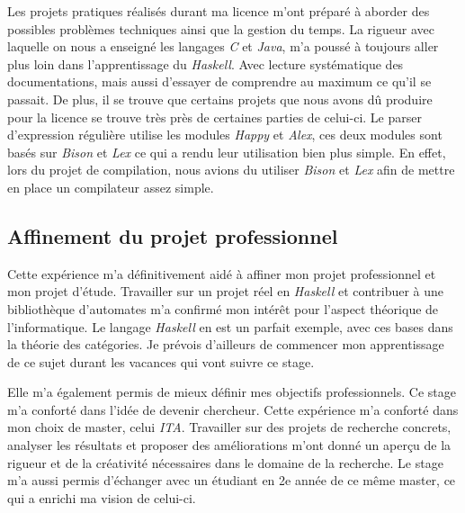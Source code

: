 \vphantom{}

Les projets pratiques réalisés durant ma licence m'ont préparé à aborder des 
possibles problèmes techniques ainsi que la gestion du temps. La rigueur avec 
laquelle on nous a enseigné les langages \textit{C} et \textit{Java}, m’a 
poussé à toujours aller plus loin dans l'apprentissage du \textit{Haskell}. Avec 
lecture systématique des documentations, mais aussi d'essayer de comprendre au 
maximum ce qu'il se passait. De plus, il se trouve que certains projets que nous 
avons dû produire pour la licence se trouve très près de certaines parties de 
celui-ci. Le parser d'expression régulière utilise les modules \textit{Happy} et 
\textit{Alex}, ces deux modules sont basés sur \textit{Bison} et \textit{Lex} ce 
qui a rendu leur utilisation bien plus simple. En effet, lors du projet de 
compilation, nous avions du utiliser \textit{Bison} et \textit{Lex} afin de 
mettre en place un compilateur assez simple. 

\subsection{Affinement du projet professionnel}

Cette expérience m'a définitivement aidé à affiner mon projet professionnel et 
mon projet d'étude. Travailler sur un projet réel en \textit{Haskell} et 
contribuer à une bibliothèque d'automates m'a confirmé mon intérêt pour l'aspect 
théorique de l'informatique. Le langage \textit{Haskell} en est un parfait 
exemple, avec ces bases dans la théorie des catégories. Je prévois d'ailleurs de 
commencer mon apprentissage de ce sujet durant les vacances qui vont suivre ce 
stage.

\vphantom{}

Elle m'a également permis de mieux définir mes objectifs professionnels. Ce 
stage m'a conforté dans l'idée de devenir chercheur. Cette expérience m'a 
conforté dans mon choix de master, celui \textit{ITA}. Travailler sur des 
projets de recherche concrets, analyser les résultats et proposer des 
améliorations m'ont donné un aperçu de la rigueur et de la créativité 
nécessaires dans le domaine de la recherche. Le stage m'a aussi permis 
d'échanger avec un étudiant en 2e année de ce même master, ce qui a enrichi ma 
vision de celui-ci.